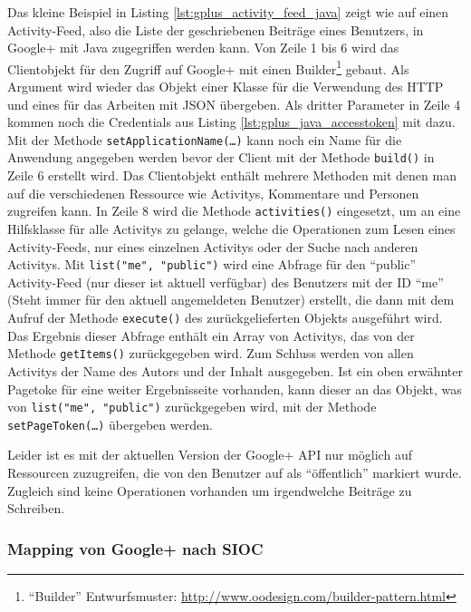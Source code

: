 Das kleine Beispiel in Listing \ref{lst:gplus_activity_feed_java} zeigt wie auf einen Activity-Feed, also die Liste der geschriebenen Beiträge eines Benutzers, in Google+ mit Java zugegriffen werden kann. Von Zeile 1 bis 6 wird das Clientobjekt für den Zugriff auf Google+ mit einen Builder\footnote{\enquote{Builder} Entwurfsmuster: \url{http://www.oodesign.com/builder-pattern.html}} gebaut. Als Argument wird wieder das Objekt einer Klasse für die Verwendung des HTTP und eines für das Arbeiten mit JSON übergeben. Als dritter Parameter in Zeile 4 kommen noch die Credentials aus Listing \ref{lst:gplus_java_accesstoken} mit dazu. Mit der Methode \texttt{setApplicationName(\dots)} kann noch ein Name für die Anwendung angegeben werden bevor der Client mit der Methode \texttt{build()} in Zeile 6 erstellt wird. Das Clientobjekt enthält mehrere Methoden mit denen man auf die verschiedenen Ressource wie Activitys, Kommentare und Personen zugreifen kann. In Zeile 8 wird die Methode \texttt{activities()} eingesetzt, um an eine Hilfsklasse für alle Activitys zu gelange, welche die Operationen zum Lesen eines Activity-Feeds, nur eines einzelnen Activitys oder der Suche nach anderen Activitys. Mit \texttt{list("me", "public")} wird eine Abfrage für den \enquote{public} Activity-Feed (nur dieser ist aktuell verfügbar) des Benutzers mit der ID \enquote{me} (Steht immer für den aktuell angemeldeten Benutzer) erstellt, die dann mit dem Aufruf der Methode \texttt{execute()} des zurückgelieferten Objekts ausgeführt wird. Das Ergebnis dieser Abfrage enthält ein Array von Activitys, das von der Methode \texttt{getItems()} zurückgegeben wird. Zum Schluss werden von allen Activitys der Name des Autors und der Inhalt ausgegeben. Ist ein oben erwähnter Pagetoke für eine weiter Ergebnisseite vorhanden, kann dieser an das Objekt, was von \texttt{list("me", "public")} zurückgegeben wird, mit der Methode \texttt{setPageToken(\dots)} übergeben werden.

Leider ist es mit der aktuellen Version der Google+ API nur möglich auf Ressourcen zuzugreifen, die von den Benutzer auf als \enquote{öffentlich} markiert wurde. Zugleich sind keine Operationen vorhanden um irgendwelche Beiträge zu Schreiben.


\subsubsection{Mapping von Google+ nach SIOC} %
\label{ssub:google_mapping_nach_sioc}

